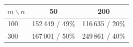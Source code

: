 \begin{tabular}{lcc}
\toprule
$m\backslash n$ & 50 & 200 \\
\midrule
100 & 152\,449 / 49\% & 116\,635 / 20\% \\
300 & 167\,001 / 50\% & 249\,861 / 40\% \\
\bottomrule
\end{tabular}
